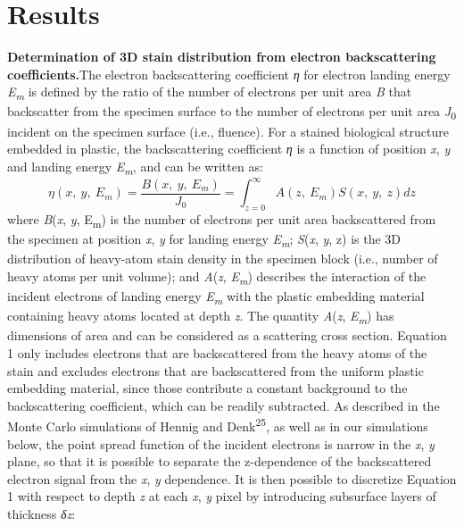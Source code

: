 \documentclass{article}
\newcommand{\cit}[1]{\textsuperscript{#1}}
\begin{document}
\section*{Results}

\noindent\textbf{Determination of 3D stain distribution from electron backscattering coefficients.}\quad The electron backscattering coefficient \emph{η} for electron landing energy \emph{E}\textsubscript{\emph{m}} is defined by the ratio of the number of electrons per unit area \emph{B} that backscatter from the specimen surface to the number of electrons per unit area \emph{J}\textsubscript{0} incident on the specimen surface (i.e., fluence). For a stained biological structure embedded in plastic, the backscattering coefficient \emph{η} is a function of position \emph{x}, \emph{y} and landing energy \emph{E}\textsubscript{\emph{m}}, and can be written as:
\begin{equation}
\eta(x,\ y,\ E_m) = \frac{B(x,\ y,\ E_m)}{J_0} = \int_{z=0}^{\infty} A(z,\ E_m)S(x,\ y,\ z)dz \tag{1}
\end{equation}
where \emph{B}(\emph{x}, \emph{y}, E\textsubscript{m}) is the number of electrons per unit area backscattered from the specimen at position \emph{x}, \emph{y} for landing energy \emph{E}\textsubscript{\emph{m}}; \emph{S}(\emph{x}, \emph{y}, z) is the 3D distribution of heavy-atom stain density in the specimen block (i.e., number of heavy atoms per unit volume); and \emph{A}(\emph{z}, \emph{E}\textsubscript{\emph{m}}) describes the interaction of the incident electrons of landing energy \emph{E}\textsubscript{\emph{m}} with the plastic embedding material containing heavy atoms located at depth \emph{z}. The quantity \emph{A}(\emph{z}, \emph{E}\textsubscript{\emph{m}}) has dimensions of area and can be considered as a scattering cross section. Equation 1 only includes electrons that are backscattered from the heavy atoms of the stain and excludes electrons that are backscattered from the uniform plastic embedding material, since those contribute a constant background to the backscattering coefficient, which can be readily subtracted. As described in the Monte Carlo simulations of Hennig and Denk\cit{25}, as well as in our simulations below, the point spread function of the incident electrons is narrow in the \emph{x}, \emph{y} plane, so that it is possible to separate the z-dependence of the backscattered electron signal from the \emph{x}, \emph{y} dependence. It is then possible to discretize Equation 1 with respect to depth \emph{z} at each \emph{x}, \emph{y} pixel by introducing subsurface layers of thickness \emph{δz}:
\end{document}
